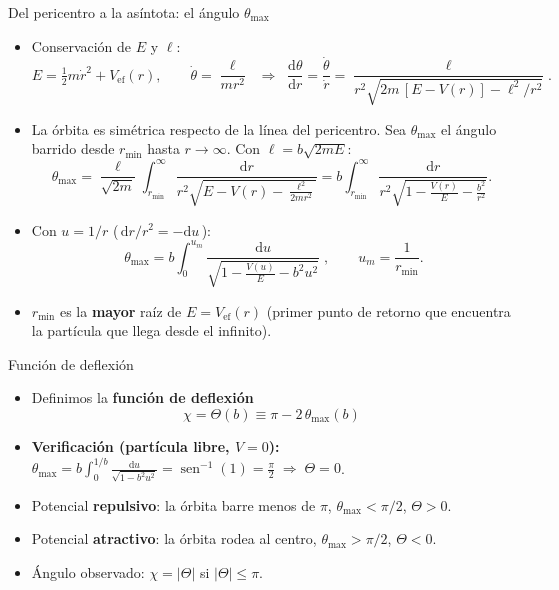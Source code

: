 \documentclass[aspectratio=169]{beamer}
\providecommand{\sen}{}
\renewcommand{\sen}{\operatorname{sen}}
\newcommand{\tmax}{\theta_{\max}}
\newcommand{\rmin}{r_{\min}}
\newcommand{\um}{u_{m}}
\newcommand{\dd}{\mathrm{d}}
\begin{document}
\begin{frame}{Del pericentro a la asíntota: el ángulo $\tmax$}
\small
\begin{itemize}
  \item<1-> Conservación de $E$ y $\ell$:
  \[
    E=\tfrac12 m\dot r^{2}+V_{\text{ef}}(r),\qquad
    \dot\theta=\frac{\ell}{m r^{2}}
    \;\;\Longrightarrow\;\;
    \frac{\dd\theta}{\dd r}=\frac{\dot\theta}{\dot r}
    =\frac{\ell}{r^{2}\sqrt{2m\,[E-V(r)]-\ell^{2}/r^{2}}} .
  \]
  \item<2-> La órbita es simétrica respecto de la línea del pericentro. Sea $\tmax$ el ángulo
        barrido desde $\rmin$ hasta $r\to\infty$. Con $\ell=b\sqrt{2mE}$:
  \[
    \tmax=\frac{\ell}{\sqrt{2m}}\int_{\rmin}^{\infty}
      \frac{\dd r}{r^{2}\sqrt{E-V(r)-\frac{\ell^{2}}{2mr^{2}}}}
    = b\int_{\rmin}^{\infty}\frac{\dd r}{r^{2}\sqrt{1-\frac{V(r)}{E}-\frac{b^{2}}{r^{2}}}} .
  \]
  \item<3-> Con $u=1/r$ (\,$\dd r/r^{2}=-\dd u$\,):
  \[
    \boxed{\;\tmax=b\int_{0}^{\um}\frac{\dd u}{\sqrt{1-\frac{V(u)}{E}-b^{2}u^{2}}}\;},
    \qquad \um=\frac{1}{\rmin}.
  \]
  \item<4-> $\rmin$ es la \textbf{mayor} raíz de $E=V_{\text{ef}}(r)$ (primer punto de
        retorno que encuentra la partícula que llega desde el infinito).
\end{itemize}
\end{frame}

\begin{frame}{Función de deflexión}
\begin{itemize}
  \item<1-> Definimos la \textbf{función de deflexión}
  \[
    \boxed{\; \chi = \Theta(b)\equiv\pi-2\,\tmax(b)\;}
  \]
  \item<2-> \textbf{Verificación (partícula libre, $V=0$):}
        $\tmax=b\int_0^{1/b}\frac{\dd u}{\sqrt{1-b^2u^2}}=\sen^{-1}(1)=\frac{\pi}{2}
        \;\Rightarrow\;\Theta=0$. \checkmark
  \item<3-> Potencial \textbf{repulsivo}: la órbita barre menos de $\pi$,
        $\tmax<\pi/2$, $\Theta>0$.
  \item<4-> Potencial \textbf{atractivo}: la órbita rodea al centro, $\tmax>\pi/2$,
        $\Theta<0$.
  \item<5-> Ángulo observado: $\chi=|\Theta|$ si $|\Theta|\le\pi$.
\end{itemize}
\end{frame}
\end{document}
